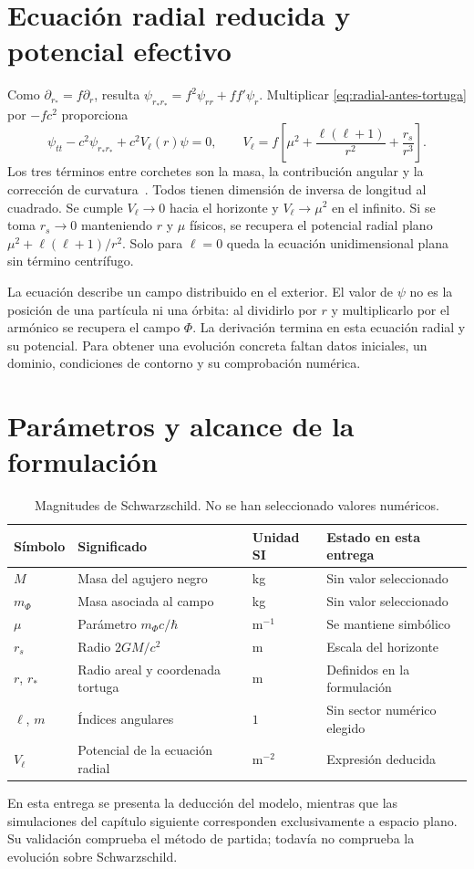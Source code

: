 \section{Ecuación radial reducida y potencial efectivo}

Como $\partial_{r_*}=f\partial_r$, resulta
$\psi_{r_*r_*}=f^2\psi_{rr}+ff'\psi_r$. Multiplicar
\eqref{eq:radial-antes-tortuga} por $-fc^2$ proporciona
\begin{equation}
\psi_{tt}-c^2\psi_{r_*r_*}+c^2V_\ell(r)\psi=0,\qquad
V_\ell=f\left[\mu^2+\frac{\ell(\ell+1)}{r^2}+\frac{r_s}{r^3}\right].
\label{eq:radial-schwarzschild}
\end{equation}
Los tres términos entre corchetes son la masa, la contribución angular
y la corrección de curvatura~\cite{Barranco2011,Barranco2012}.
Todos tienen dimensión de inversa de longitud al cuadrado. Se cumple
$V_\ell\to0$ hacia el horizonte y $V_\ell\to\mu^2$ en el infinito.
Si se toma $r_s\to0$ manteniendo $r$ y $\mu$ físicos, se recupera el
potencial radial plano $\mu^2+\ell(\ell+1)/r^2$. Solo para $\ell=0$
queda la ecuación unidimensional plana sin término centrífugo.

La ecuación describe un campo distribuido en el exterior. El valor de
$\psi$ no es la posición de una partícula ni una órbita: al dividirlo
por $r$ y multiplicarlo por el armónico se recupera el campo $\Phi$.
La derivación termina en esta ecuación radial y su potencial. Para
obtener una evolución concreta faltan datos iniciales, un dominio,
condiciones de contorno y su comprobación numérica.

\section{Parámetros y alcance de la formulación}
\label{sec:parametros-principal}
\begin{table}[!htbp]
\centering\footnotesize
\begin{tabularx}{\textwidth}{@{}lXlX@{}}
\toprule
Símbolo & Significado & Unidad SI & Estado en esta entrega \\
\midrule
$M$ & Masa del agujero negro & kg & Sin valor seleccionado \\
$m_\Phi$ & Masa asociada al campo & kg & Sin valor seleccionado \\
$\mu$ & Parámetro $m_\Phi c/\hbar$ & $\mathrm{m}^{-1}$ & Se mantiene simbólico \\
$r_s$ & Radio $2GM/c^2$ & m & Escala del horizonte \\
$r$, $r_*$ & Radio areal y coordenada tortuga & m & Definidos en la formulación \\
$\ell$, $m$ & Índices angulares & $1$ & Sin sector numérico elegido \\
$V_\ell$ & Potencial de la ecuación radial & $\mathrm{m}^{-2}$ & Expresión deducida \\
\bottomrule
\end{tabularx}
\caption[Parámetros de la formulación en Schwarzschild.]{Magnitudes de Schwarzschild. No se han seleccionado valores numéricos.}
\label{tab:parametros-principal}
\end{table}

En esta entrega se presenta la deducción del modelo, mientras que las
simulaciones del capítulo siguiente corresponden exclusivamente a
espacio plano. Su validación comprueba el método de partida; todavía
no comprueba la evolución sobre Schwarzschild.
